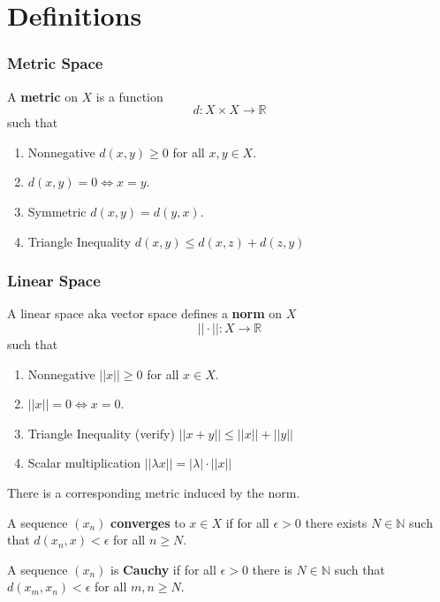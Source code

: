 \documentclass[12pt]{article}
\begin{document}
\section{Definitions}

\subsubsection{Metric Space}
A \textbf{metric} on $X$ is a function
\[
    d: X \times X \rightarrow \mathbb{R}
\]
such that

\begin{enumerate}
    \item Nonnegative $d(x, y) \geq 0$ for all $x, y \in X$.

    \item $d(x, y) = 0 \iff x = y$.

    \item Symmetric $d(x, y) = d(y, x)$.

    \item Triangle Inequality $d(x, y) \leq d(x, z) + d(z, y)$
\end{enumerate}

\subsubsection{Linear Space}
A linear space aka vector space defines a \textbf{norm} on $X$
\[
    || \cdot ||: X \rightarrow \mathbb{R}
\]
such that

\begin{enumerate}
    \item Nonnegative $||x|| \geq 0$ for all $x \in X$.

    \item $||x|| = 0 \iff x = 0$.

    \item Triangle Inequality (verify) $||x + y|| \leq ||x|| + ||y||$

    \item Scalar multiplication $|| \lambda x || = |\lambda| \cdot ||x||$

\end{enumerate}

There is a corresponding metric induced by the norm.


A sequence $(x_n)$ \textbf{converges} to $x \in X$ if for all $\epsilon > 0$ there
exists $N \in \mathbb{N}$ such that $d(x_n, x) < \epsilon$ for all $n \geq
N$.

A sequence $(x_n)$ is \textbf{Cauchy} if for all $\epsilon > 0$ there is $N
\in \mathbb{N}$ such that $d(x_m, x_n) < \epsilon$ for all $m, n \geq N$.
\end{document}
